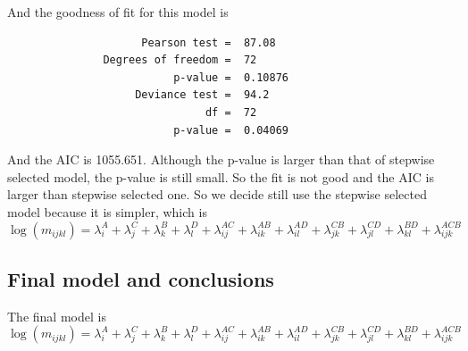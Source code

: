 \documentclass{article}
\begin{document}
    And the goodness of fit for this model is
    \begin{verbatim}
                     Pearson test =  87.08
               Degrees of freedom =  72
                          p-value =  0.10876
                    Deviance test =  94.2
                               df =  72
                          p-value =  0.04069 
    \end{verbatim}
    And the AIC is 1055.651. Although the p-value is larger than that of stepwise selected model, the p-value is still small. So the fit is not good and the AIC is larger than stepwise selected one. So we decide still use the stepwise selected model because it is simpler, which is
    \[\log(m_{ijkl}) = \lambda_{i}^A + \lambda_{j}^C + \lambda_{k}^B + \lambda_{l}^D + \lambda_{ij}^{AC} + \lambda_{ik}^{AB} + \lambda_{il}^{AD} + \lambda_{jk}^{CB} + \lambda_{jl}^{CD} + \lambda_{kl}^{BD} + \lambda_{ijk}^{ACB}\]
		\subsection{Final model and conclusions}

    The final model is
    \[\log(m_{ijkl}) = \lambda_{i}^A + \lambda_{j}^C + \lambda_{k}^B + \lambda_{l}^D + \lambda_{ij}^{AC} + \lambda_{ik}^{AB} + \lambda_{il}^{AD} + \lambda_{jk}^{CB} + \lambda_{jl}^{CD} + \lambda_{kl}^{BD} + \lambda_{ijk}^{ACB}\]
\end{document}
